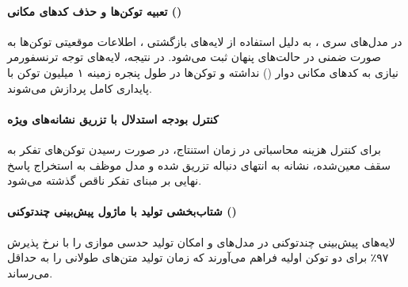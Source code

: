 \item {}

\paragraph*{تعبیه توکن‌ها و حذف کدهای مکانی ()}
در مدل‌های سری  \cite{nvidia2025nemotron3}، به دلیل استفاده از لایه‌های بازگشتی ، اطلاعات موقعیتی توکن‌ها به صورت ضمنی در حالت‌های پنهان ثبت می‌شود. در نتیجه، لایه‌های توجه ترنسفورمر نیازی به کدهای مکانی دوار () نداشته و توکن‌ها در طول پنجره زمینه ۱ میلیون توکن با پایداری کامل پردازش می‌شوند.

\paragraph*{کنترل بودجه استدلال با تزریق نشانه‌های ویژه}
برای کنترل هزینه محاسباتی در زمان استنتاج، در صورت رسیدن توکن‌های تفکر به سقف معین‌شده، نشانه  به انتهای دنباله تزریق شده و مدل موظف به استخراج پاسخ نهایی بر مبنای تفکر ناقص گذشته می‌شود.

\paragraph*{شتاب‌بخشی تولید با ماژول پیش‌بینی چندتوکنی ()}
لایه‌های پیش‌بینی چندتوکنی در مدل‌های  و  امکان تولید حدسی موازی را با نرخ پذیرش ۹۷٪ برای دو توکن اولیه فراهم می‌آورند که زمان تولید متن‌های طولانی را به حداقل می‌رساند.
